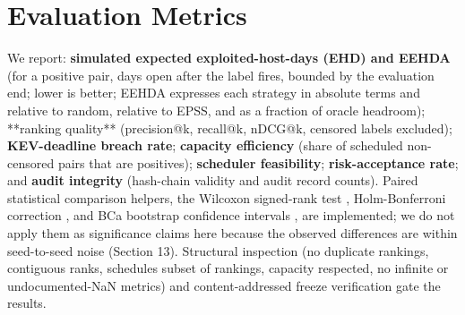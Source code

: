 \section{Evaluation Metrics}

We report: \textbf{simulated expected exploited-host-days (EHD) and EEHDA} (for a
positive pair, days open after the label fires, bounded by the evaluation end;
lower is better; EEHDA expresses each strategy in absolute terms and relative to
random, relative to EPSS, and as a fraction of oracle headroom); **ranking
quality** (precision@k, recall@k, nDCG@k, censored labels excluded);
\textbf{KEV-deadline breach rate}; \textbf{capacity efficiency} (share of scheduled
non-censored pairs that are positives); \textbf{scheduler feasibility};
\textbf{risk-acceptance rate}; and \textbf{audit integrity} (hash-chain validity and audit
record counts). Paired statistical comparison helpers, the Wilcoxon signed-rank
test \cite{wilcoxon1945}, Holm-Bonferroni correction \cite{holm1979}, and BCa bootstrap
confidence intervals \cite{efron1987better}, are implemented; we do not apply them as
significance claims here because the observed differences are within seed-to-seed
noise (Section 13). Structural inspection (no duplicate rankings, contiguous ranks,
schedules subset of rankings, capacity respected, no infinite or
undocumented-NaN metrics) and content-addressed freeze verification gate the
results.
